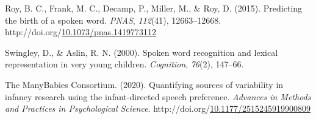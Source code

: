 \documentclass[10pt, letterpaper]{article}
\begin{document}
\begin{CSLReferences}{1}{0}
\leavevmode\hypertarget{ref-Roy2015}{}%
Roy, B. C., Frank, M. C., Decamp, P., Miller, M., \& Roy, D. (2015).
{Predicting the birth of a spoken word}. \emph{PNAS}, \emph{112}(41),
12663--12668.
http://doi.org/\href{https://doi.org/10.1073/pnas.1419773112}{10.1073/pnas.1419773112}

\leavevmode\hypertarget{ref-Swingley2000}{}%
Swingley, D., \& Aslin, R. N. (2000). {Spoken word recognition and
lexical representation in very young children.} \emph{Cognition},
\emph{76}(2), 147--66.

\leavevmode\hypertarget{ref-TheManyBabiesConsortium2020}{}%
The ManyBabies Consortium. (2020). {Quantifying sources of variability
in infancy research using the infant-directed speech preference}.
\emph{Advances in Methods and Practices in Psychological Science}.
http://doi.org/\href{https://doi.org/10.1177/2515245919900809}{10.1177/2515245919900809}

\end{CSLReferences}


\end{document}
